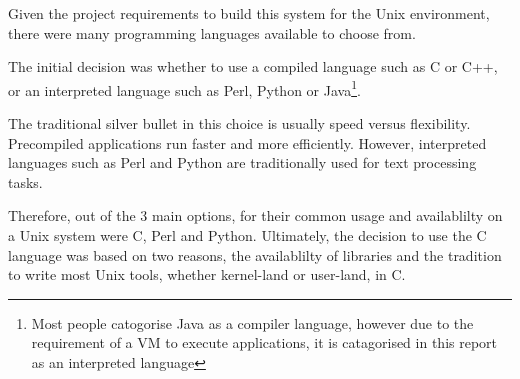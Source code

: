 
Given the project requirements to build this system for the Unix
environment, there were many programming languages available to choose
from.


The initial decision was whether to use a compiled language such as C or
C++, or an interpreted language such as Perl, Python or
Java\footnote{Most people catogorise Java as a compiler language,
however due to the requirement of a VM to execute applications, it is
catagorised in this report as an interpreted language}. 


The traditional silver bullet in this choice is usually speed versus 
flexibility. Precompiled applications run faster and more efficiently. 
However, interpreted languages such as Perl and Python are traditionally
used for text processing tasks. 


Therefore, out of the 3 main options, for their common usage and
availablilty on a Unix system were C, Perl and Python. Ultimately, the
decision to use the C language was based on two reasons, the
availablilty of libraries and the tradition to write most Unix tools,
whether kernel-land or user-land, in C.
